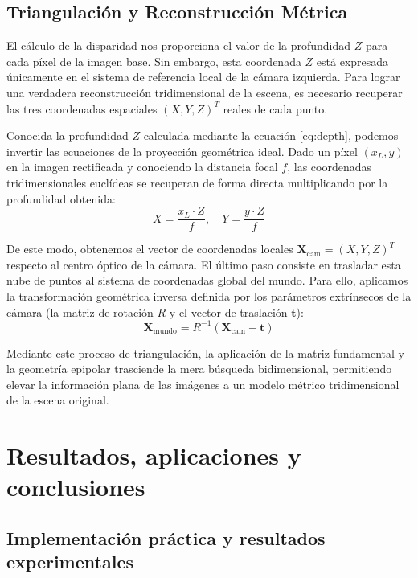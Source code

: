 \documentclass[
10pt, %
a4paper, %
oneside, %
headinclude,footinclude, %
BCOR=5mm, %
]{scrartcl}
\begin{document}
\subsection{Triangulación y Reconstrucción Métrica}

El cálculo de la disparidad nos proporciona el valor de la profundidad $Z$ para cada píxel de la imagen base. Sin embargo, esta coordenada $Z$ está expresada únicamente en el sistema de referencia local de la cámara izquierda. Para lograr una verdadera reconstrucción tridimensional de la escena, es necesario recuperar las tres coordenadas espaciales $(X, Y, Z)^T$ reales de cada punto.

Conocida la profundidad $Z$ calculada mediante la ecuación \eqref{eq:depth}, podemos invertir las ecuaciones de la proyección geométrica ideal. Dado un píxel $(x_L, y)$ en la imagen rectificada y conociendo la distancia focal $f$, las coordenadas tridimensionales euclídeas se recuperan de forma directa multiplicando por la profundidad obtenida:
$$X = \frac{x_L \cdot Z}{f}, \quad Y = \frac{y \cdot Z}{f}$$

De este modo, obtenemos el vector de coordenadas locales $\mathbf{X}_{\text{cam}} = (X, Y, Z)^T$ respecto al centro óptico de la cámara. El último paso consiste en trasladar esta nube de puntos al sistema de coordenadas global del mundo. Para ello, aplicamos la transformación geométrica inversa definida por los parámetros extrínsecos de la cámara (la matriz de rotación $R$ y el vector de traslación $\mathbf{t}$):
$$\mathbf{X}_{\text{mundo}} = R^{-1} (\mathbf{X}_{\text{cam}} - \mathbf{t})$$

Mediante este proceso de triangulación, la aplicación de la matriz fundamental y la geometría epipolar trasciende la mera búsqueda bidimensional, permitiendo elevar la información plana de las imágenes a un modelo métrico tridimensional de la escena original.

\newpage


\section{Resultados, aplicaciones y conclusiones}

\subsection{Implementación práctica y resultados experimentales}
\end{document}
